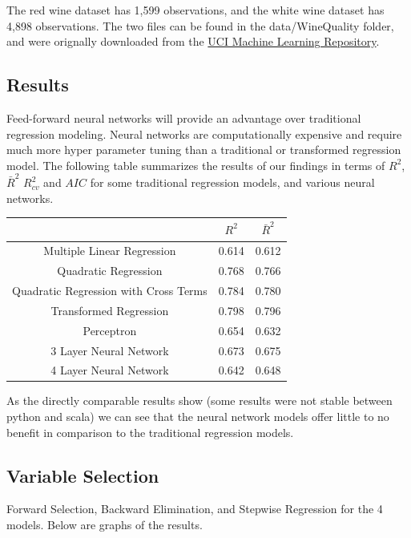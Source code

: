 \documentclass{article}
\begin{document}
	The red wine dataset has 1,599 observations, and the white wine dataset has 4,898 observations. 
	The two files can be found in the data/WineQuality folder, and were orignally downloaded from 
	the \href{https://archive.ics.uci.edu/ml/datasets/wine+quality}{UCI Machine Learning Repository}. 

	\subsection{Results}

	Feed-forward neural networks will provide an advantage over 
	traditional regression modeling. Neural networks 
	are computationally expensive and require much more hyper parameter tuning than a traditional or 
	transformed regression model. The following table summarizes the results of our findings in terms 
	of $R^2$, $\bar R^2$ $R^2_{cv}$ and $AIC$ for some traditional regression models, and various neural networks. 
	

	\begin{tabular}{|c|c|c|}
		\hline
		& $R^2$ & $\bar R^2$ \\ \hline
		Multiple Linear Regression            & 0.614 & 0.612      \\ \hline
		Quadratic Regression                  & 0.768 & 0.766      \\ \hline
		Quadratic Regression with Cross Terms & 0.784 & 0.780      \\ \hline
		Transformed Regression                & 0.798 & 0.796      \\ \hline
		Perceptron                            & 0.654 & 0.632     \\ \hline
		3 Layer Neural Network                & 0.673 & 0.675      \\ \hline
		4 Layer Neural Network                & 0.642 & 0.648     \\ \hline
	\end{tabular}

	As the directly comparable results show (some results were not stable between python and scala) we can see that the neural 
	network models offer little to no benefit in comparison to the traditional regression models.
	
	\subsection{Variable Selection}
	
	Forward Selection, Backward Elimination, and Stepwise Regression for the 4 models. Below are graphs of the results.
	
\end{document}
